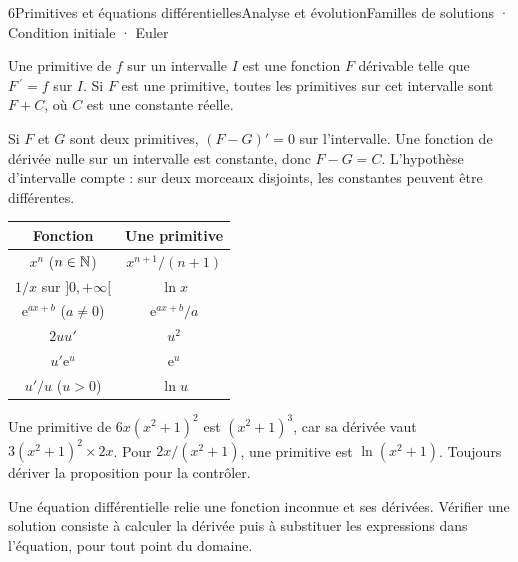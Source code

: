 \begin{ouverture}[equadiff]{6}{Primitives et équations différentielles}{Analyse et évolution}{Familles de solutions · Condition initiale · Euler}
\end{ouverture}
\essentiel

\begin{definition}
Une primitive de $f$ sur un intervalle $I$ est une fonction $F$ dérivable telle que $F\,\!^{\prime}=f$ sur $I$.
Si $F$ est une primitive, toutes les primitives sur cet intervalle sont $F+C$, où $C$ est une constante réelle.
\end{definition}
\begin{demonstration}
Si $F$ et $G$ sont deux primitives, $(F-G)'=0$ sur l'intervalle. Une fonction de dérivée nulle sur un intervalle est constante, donc $F-G=C$.
L'hypothèse d'intervalle compte : sur deux morceaux disjoints, les constantes peuvent être différentes.
\end{demonstration}
\begin{center}\begin{tabular}{c|c}Fonction & Une primitive\\\hline
$x^n$ ($n\in\mathbb{N}$)&$x^{n+1}/(n+1)$\\
$1/x$ sur $]0,+\infty[$&$\ln x$\\
$\mathrm e^{ax+b}$ ($a\ne0$)&$\mathrm e^{ax+b}/a$\\
$2uu'$&$u^2$\\
$u'\mathrm e^u$&$\mathrm e^u$\\
$u'/u$ ($u>0$)&$\ln u$\end{tabular}\end{center}
\begin{exemple}
Une primitive de $6x(x^2+1)^2$ est $(x^2+1)^3$, car sa dérivée vaut $3(x^2+1)^2\times2x$.
Pour $2x/(x^2+1)$, une primitive est $\ln(x^2+1)$.
Toujours dériver la proposition pour la contrôler.
\end{exemple}
Une équation différentielle relie une fonction inconnue et ses dérivées. Vérifier une solution consiste à calculer la dérivée puis à substituer les expressions dans l'équation, pour tout point du domaine.
